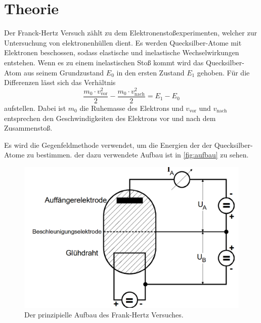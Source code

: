 \section{Theorie}
\label{sec:theorie}

Der Franck-Hertz Versuch zählt zu dem Elektronenstoßexperimenten, welcher zur Untersuchung von elektronenhüllen dient.
Es werden Quecksilber-Atome mit Elektronen beschossen, sodass elastische und inelastische Wechselwirkungen entstehen.
Wenn es zu einem inelastischen Stoß kommt wird das Quecksilber-Atom aus seinem Grundzustand $E_0$ in den 
ersten Zustand $E_1$ gehoben. Für die Differenzen lässt sich das Verhältnis 
\begin{equation}
    \frac{m_0 \cdot v_{\text{vor}}^2}{2} - \frac{m_0 \cdot v_{\text{nach}}^2}{2} = E_1 - E_0
    \label{eqn:diff}
\end{equation}
aufstellen. Dabei ist $m_0$ die Ruhemasse des Elektrons und $v_{\text{vor}}$ und $v_{\text{nach}}$ entsprechen den Geschwindigkeiten
des Elektrons vor und nach dem Zusammenstoß.

Es wird die Gegenfeldmethode verwendet, um die Energien der der Quecksilber-Atome zu bestimmen. 
der dazu verwendete Aufbau ist in \autoref{fig:aufbau} zu sehen.

\begin{figure}[H]
	\centering
	\includegraphics[width=0.75\linewidth]{content/grafik/aufbau.png}
	\caption{Der prinzipielle Aufbau des Frank-Hertz Versuches. \cite{franck}}
	\label{fig:aufbau}
\end{figure}

